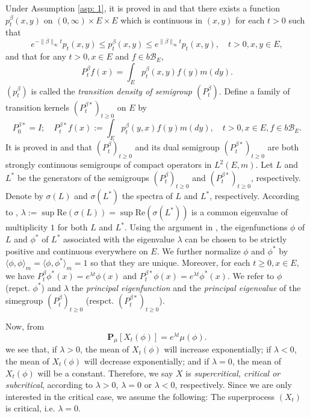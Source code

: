 \documentclass[12pt, a4paper]{amsart}
\theoremstyle{definition}
\newenvironment{asp}[1]{\renewcommand\theinnerasp{#1}\innerasp}{\endinnerasp}
\numberwithin{equation}{section}
\begin{document}
	Under Assumption \ref{asp: 1}, it is proved in \cite{RenSongZhang2015Limit} and \cite{RenSongZhang2017Central} that there exists a function $p^\beta_t(x,y)$ on $(0,\infty) \times E \times E$ which is continuous in $(x,y)$ for each $t>0$ such that
\[
	e^{-\|\beta\|_\infty t} p_t(x,y)
	\leq p^{\beta}_t(x,y)
	\leq e^{\|\beta\|_\infty t} p_t(x,y),
	\quad t>0, x, y\in E,
\]
	and that for any $t>0, x\in E$ and $f \in b\mathscr B_E$,
\[
	P^\beta_t f(x)
	= \int_E p_t^\beta (x,y) f(y) m(dy).
\]
	 $(p^\beta_t)$ is called the
	\emph{transition density of semigroup $(P^\beta_t)$}.
	Define a family of transition kernels $(P^{\beta *}_t)_{t \geq 0}$ on $E$ by
\[
	P^{\beta *}_0 = I;
	\quad P^{\beta *}_t f(x)
	:= \int_E p^\beta_t (y,x) f(y) m(dy),
	\quad t>0, x\in E, f\in b\mathscr B_E.
\]
	It is proved in \cite{RenSongZhang2015Limit} and \cite{RenSongZhang2017Central} that $(P^\beta_t)_{t \geq 0}$ and its dual semigroup $(P^{\beta *}_t)_{t \geq 0}$ are both strongly continuous semigroups of compact operators in $L^2(E,m)$.
	Let $L$ and $L^*$ be the generators of the semigroups $(P^\beta_t)_{t \geq 0}$ and $(P^{\beta *}_t)_{t \geq 0}$, respectively.
	Denote by $\sigma(L)$ and $\sigma(L^*)$ the spectra of $L$ and $L^*$, respectively.
	According to \cite[Theorem V.6.6.]{Schaefer1974Banach}, $\lambda := \sup \text{Re}(\sigma(L)) = \sup \text{Re}(\sigma(L^*))$ is a common eigenvalue of multiplicity $1$ for both $L$ and $L^*$.
	Using the argument in \cite{RenSongZhang2015Limit}, the eigenfunctions $\phi$ of $L$ and $\phi^*$ of $L^*$ associated with the eigenvalue $\lambda$ can be chosen to be strictly positive and continuous everywhere on $E$.
	We further normalize $\phi$ and $\phi^*$ by $\langle\phi, \phi\rangle_m = \langle\phi,\phi^*\rangle_m = 1$ so that they are unique.
	Moreover, for each $t\geq 0,x\in E$, we have $P^\beta_t \phi^*(x) = e^{\lambda t} \phi(x)$ and $P^{\beta *}_t \phi(x) = e^{\lambda t} \phi^*(x)$.
	We refer to $\phi$ (repct. $\phi^*$) and $\lambda$ the \emph{principal eigenfunction} and the \emph{principal eigenvalue} of the simegroup $(P^\beta_t)_{t\geq 0}$ (respct. $(P^{\beta *}_t)_{t\geq 0}$).
	
	Now, from
\[
	\mathbf P_\mu[X_t(\phi)]
	= e^{\lambda t} \mu(\phi).
\]
	we see that, if $\lambda > 0$, the mean of $X_t(\phi)$ will increase exponentially; if $\lambda < 0$, the mean of $X_t(\phi)$ will decrease exponentially; and if $\lambda = 0$, the mean of $X_t(\phi)$ will be a constant.
	Therefore, we say $X$ is \emph{supercritical, critical or subcritical}, according to $\lambda > 0$, $\lambda = 0$ or $\lambda < 0$, respectively.
	Since we are only interested in the critical case, we assume the following:
\begin{asp}{2} \label{asp: 2}
	The superprocess $(X_t)$ is critical, i.e. $\lambda = 0$.
\end{asp}
\end{document}
